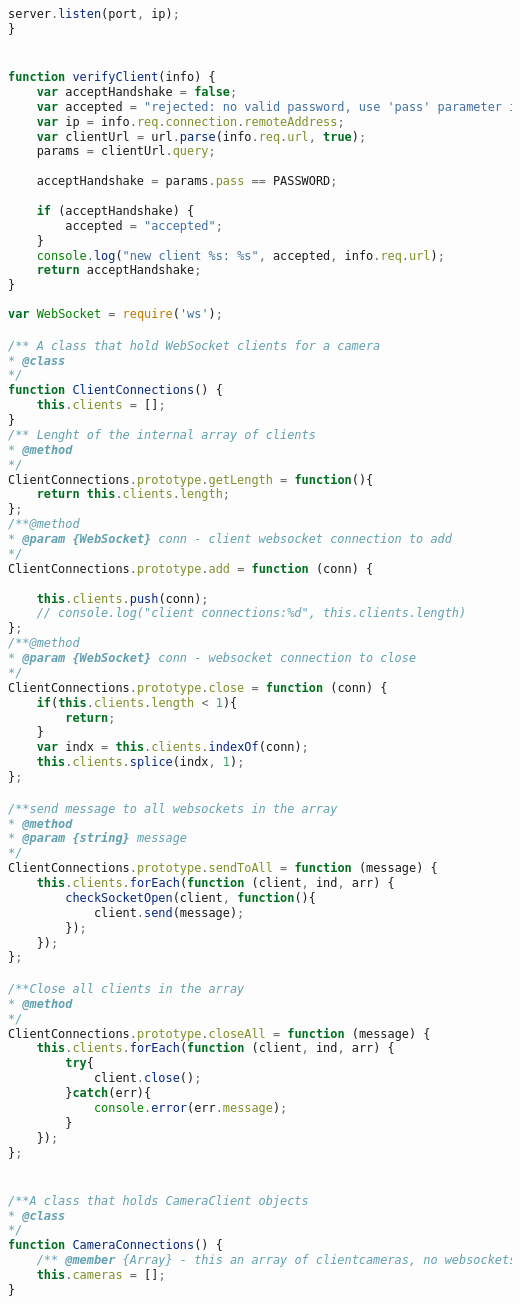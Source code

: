 \documentclass[hidelinks,11pt,a4paper,oneside,article]{memoir}
\begin{document}
\begin{lstlisting}[label={listing:nodejsmain},caption={Main file},language=JavaScript, style=styleprogrammingappendix]
    server.listen(port, ip);
}


function verifyClient(info) {
    var acceptHandshake = false;
    var accepted = "rejected: no valid password, use 'pass' parameter in the handshake please";
    var ip = info.req.connection.remoteAddress;
    var clientUrl = url.parse(info.req.url, true);
    params = clientUrl.query;
    
    acceptHandshake = params.pass == PASSWORD;
    
    if (acceptHandshake) {
        accepted = "accepted";
    }
    console.log("new client %s: %s", accepted, info.req.url);
    return acceptHandshake;
}
\end{lstlisting}

\begin{lstlisting}[label={listing:nodejsimplementation},caption={implementation of server-side classes},language=JavaScript, style=styleprogrammingappendix]
var WebSocket = require('ws');

/** A class that hold WebSocket clients for a camera
* @class
*/
function ClientConnections() {
    this.clients = [];
}
/** Lenght of the internal array of clients
* @method
*/
ClientConnections.prototype.getLength = function(){
    return this.clients.length;
};
/**@method
* @param {WebSocket} conn - client websocket connection to add
*/
ClientConnections.prototype.add = function (conn) {
    
    this.clients.push(conn);
    // console.log("client connections:%d", this.clients.length)
};
/**@method
* @param {WebSocket} conn - websocket connection to close
*/
ClientConnections.prototype.close = function (conn) {
    if(this.clients.length < 1){
        return;
    }
    var indx = this.clients.indexOf(conn);
    this.clients.splice(indx, 1);
};

/**send message to all websockets in the array
* @method
* @param {string} message 
*/
ClientConnections.prototype.sendToAll = function (message) {
    this.clients.forEach(function (client, ind, arr) {
        checkSocketOpen(client, function(){
            client.send(message);
        });
    });
};

/**Close all clients in the array
* @method
*/
ClientConnections.prototype.closeAll = function (message) {
    this.clients.forEach(function (client, ind, arr) {
        try{
            client.close();
        }catch(err){
            console.error(err.message);
        }
    });
};


/**A class that holds CameraClient objects
* @class
*/
function CameraConnections() {
    /** @member {Array} - this an array of clientcameras, no websockets connections */
    this.cameras = [];
}


\end{lstlisting}
\end{document}
